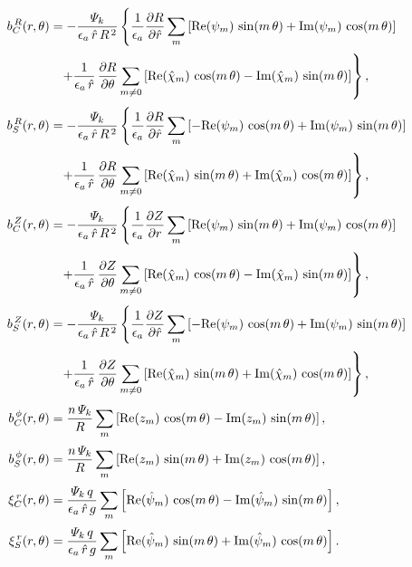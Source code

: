 \documentclass[12pt,prb,aps,notitlepage]{revtex4-1}
\begin{document}
\begin{align}
b_C^{\,R}(r,\theta) &= -\frac{{\mit\Psi}_k}{\epsilon_a\,\hat{r}\,R^{\,2}}\left\{\frac{1}{\epsilon_a}\frac{\partial R}{\partial \hat{r}}\sum_m\left[{\rm Re}(\psi_m)\,\sin(m\,\theta) + {\rm Im}(\psi_m)\,\cos(m\,\theta)\right]\right.\\[0.5ex]
&\phantom{=} \left.+ \frac{1}{\epsilon_a\,\hat{r}}\,\frac{\partial R}{\partial\theta}\sum_{m\neq 0}\left[{\rm Re}(\hat{\chi}_m)\,\cos(m\,\theta) - {\rm Im}(\hat{\chi}_m)\,\sin(m\,\theta)\right]\right\},\\[0.5ex]
b_S^{\,R}(r,\theta) &= -\frac{{\mit\Psi}_k}{\epsilon_a\,\hat{r}\,R^{\,2}}\left\{\frac{1}{\epsilon_a}\frac{\partial R}{\partial \hat{r}}\sum_m\left[-{\rm Re}(\psi_m)\,\cos(m\,\theta) + {\rm Im}(\psi_m)\,\sin(m\,\theta)\right]\right.\\[0.5ex]
&\phantom{=} \left.+ \frac{1}{\epsilon_a\,\hat{r}}\,\frac{\partial R}{\partial\theta}\sum_{m\neq 0}\left[{\rm Re}(\hat{\chi}_m)\,\sin(m\,\theta) + {\rm Im}(\hat{\chi}_m)\,\cos(m\,\theta)\right]\right\},\\[0.5ex]
b_C^{\,Z}(r,\theta) &= -\frac{{\mit\Psi}_k}{\epsilon_a\,\hat{r}\,R^{\,2}}\left\{\frac{1}{\epsilon_a}\frac{\partial Z}{\partial r}\sum_m\left[{\rm Re}(\psi_m)\,\sin(m\,\theta) + {\rm Im}(\psi_m)\,\cos(m\,\theta)\right]\right.\\[0.5ex]
&\phantom{=} \left.+ \frac{1}{\epsilon_a\,\hat{r}}\,\frac{\partial Z}{\partial\theta}\sum_{m\neq 0}\left[{\rm Re}(\hat{\chi}_m)\,\cos(m\,\theta) - {\rm Im}(\hat{\chi}_m)\,\sin(m\,\theta)\right]\right\},\\[0.5ex]
b_S^{\,Z}(r,\theta) &= -\frac{{\mit\Psi}_k}{\epsilon_a\,\hat{r}\,R^{\,2}}\left\{\frac{1}{\epsilon_a}\frac{\partial Z}{\partial \hat{r}}\sum_m\left[-{\rm Re}(\psi_m)\,\cos(m\,\theta) + {\rm Im}(\psi_m)\,\sin(m\,\theta)\right]\right.\\[0.5ex]
&\phantom{=} \left.+ \frac{1}{\epsilon_a\,\hat{r}}\,\frac{\partial Z}{\partial\theta}\sum_{m\neq 0}\left[{\rm Re}(\hat{\chi}_m)\,\sin(m\,\theta) +{\rm Im}(\hat{\chi}_m)\,\cos(m\,\theta)\right]\right\},\\[0.5ex]
b_C^{\,\phi}(r,\theta) & =\frac{n\,{\mit\Psi}_k}{R}\sum_{m}\left[{\rm Re}(z_m)\,\cos(m\,\theta) - {\rm Im}(z_m)\,\sin(m\,\theta)\right],\\[0.5ex]
b_S^{\,\phi}(r,\theta) &= \frac{n\,{\mit\Psi}_k}{R}\sum_{m}\left[{\rm Re}(z_m)\,\sin(m\,\theta) + {\rm Im}(z_m)\,\cos(m\,\theta)\right],\\[0.5ex]
\xi_C^{\,r}(r,\theta) & =\frac{{\mit\Psi}_k\,q}{\epsilon_a\,\hat{r}\,g}\sum_{m}\left[{\rm Re}(\hat{\psi}_m)\,\cos(m\,\theta) - {\rm Im}(\hat{\psi}_m)\,\sin(m\,\theta)\right],\\[0.5ex]
\xi_S^{\,r}(r,\theta) &= \frac{{\mit\Psi}_k\,q}{\epsilon_a\,\hat{r}\,g}\sum_{m}\left[{\rm Re}(\hat{\psi}_m)\,\sin(m\,\theta) + {\rm Im}(\hat{\psi}_m)\,\cos(m\,\theta)\right].
\end{align}
\end{document}
